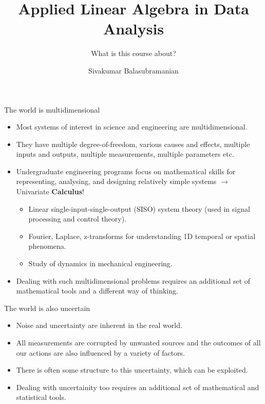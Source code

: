 \documentclass[aspectratio=169]{beamer}
\title{Applied Linear Algebra in Data Analysis}
\subtitle{What is this course about?}
\author{Sivakumar Balasubramanian}
\institute[Christian Medical College] %
{
  \inst{}%
  Department of Bioengineering\\
  Christian Medical College, Bagayam\\
  Vellore 632002
}
\date{}
\let\olditem\item
\renewcommand{\item}{\setlength{\itemsep}{\fill}\olditem}
\begin{document}
\begin{frame}
  \titlepage
\end{frame}


\begin{frame}[t]{The world is multidimensional}
\begin{itemize}
  \item Most systems of interest in science and engineering are multidimensional.
  \item They have multiple degree-of-freedom, various causes and effects, multiple inputs and outputs, multiple measurements, multiple parameters etc.
  \item Undergraduate engineering programs focus on mathematical skills for representing, analysing, and designing relatively simple systems $\longrightarrow$ Univariate \textbf{Calculus}!
  \begin{itemize}
    \item Linear single-input-single-output (SISO) system theory (used in signal processing and control theory).
    \item Fourier, Laplace, z-transforms for understanding 1D temporal or spatial phenomena.
    \item Study of dynamics in mechanical engineering.
  \end{itemize}
  \item Dealing with such multidimensional problems requires an additional set of mathematical tools and a different way of thinking. 
\end{itemize}
\end{frame}


\begin{frame}{The world is also uncertain}
\begin{itemize}
  \item Noise and uncertainty are inherent in the real world.
  \item All measurements are corrupted by unwanted sources and the outcomes of all our actions are also influenced by a variety of factors.
  \item There is often some structure to this uncertainty, which can be exploited.
  \item Dealing with uncertainity too requires an additional set of mathematical and statistical tools.
\end{itemize}
\end{frame}
\end{document}
